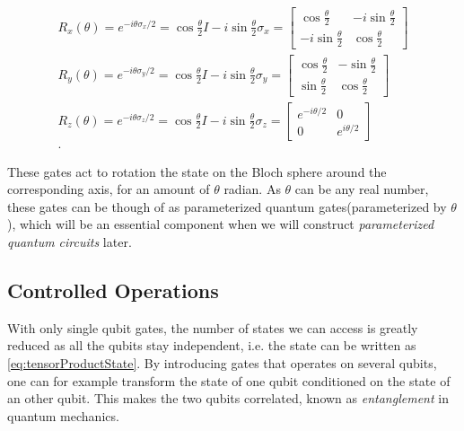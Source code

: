 \begin{equation}\label{eq:PauliRotations}
\begin{aligned}
    R_x(\theta) = e^{-i\theta\sigma_x/2} = \cos{\frac{\theta}{2}}I - i\sin{\frac{\theta}{2}}\sigma_x
    =
    \begin{bmatrix}
        \cos{\frac{\theta}{2}} & -i\sin{\frac{\theta}{2}} \\
        -i\sin{\frac{\theta}{2}} & \cos{\frac{\theta}{2}}
    \end{bmatrix}\\
    R_y(\theta) = e^{-i\theta\sigma_y/2} = \cos{\frac{\theta}{2}}I - i\sin{\frac{\theta}{2}}\sigma_y
    =
    \begin{bmatrix}
        \cos{\frac{\theta}{2}} & -\sin{\frac{\theta}{2}} \\
        \sin{\frac{\theta}{2}} & \cos{\frac{\theta}{2}}
    \end{bmatrix}\\
    R_z(\theta) = e^{-i\theta\sigma_z/2} = \cos{\frac{\theta}{2}}I - i\sin{\frac{\theta}{2}}\sigma_z
    =
    \begin{bmatrix}
        e^{-i\theta/2} & 0 \\
        0 & e^{i\theta/2}
    \end{bmatrix}\\.
\end{aligned}    
\end{equation}

These gates act to rotation the state on the Bloch sphere around the corresponding axis, for an amount of $\theta$ radian. As $\theta$ can be any real number, these gates can be though of as parameterized quantum gates(parameterized by $\theta$), which will be an essential component when we will construct \emph{parameterized quantum circuits} later.  









\subsection{Controlled Operations}\label{sec:ControlledOperations}
With only single qubit gates, the number of states we can access is greatly reduced as all the qubits stay independent, i.e. the state can be written as \autoref{eq:tensorProductState}. By introducing gates that operates on several qubits, one can for example transform the state of one qubit conditioned on the state of an other qubit. This makes the two qubits correlated, known as \emph{entanglement} in quantum mechanics.

